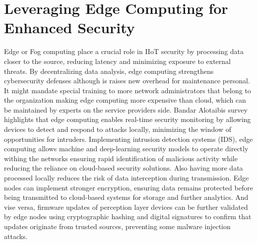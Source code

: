 \documentclass[article,a4paper]{IEEEtran}
\begin{document}
\section{Leveraging Edge Computing for Enhanced Security}
Edge or Fog computing place a crucial role in IIoT security by processing data closer to the source, reducing latency and minimizing exposure to external threats. By decentralizing data analysis, edge computing strengthens cybersecurity defenses although is raises new overhead for maintenance personal. It might mandate special training to more network administrators that belong to the organization making edge computing more expensive than cloud, which can be maintained by experts on the service providers side.
\newline 
Bandar Alotaibis survey \cite{SurveySecurity} highlights that edge computing enables real-time security monitoring by allowing devices to detect and respond to attacks locally, minimizing the window of opportunities for intruders. Implementing intrusion detection systems (IDS), edge computing allows machine and deep-learning security models to operate directly withing the networks ensuring rapid identification of malicious activity while reducing the reliance on cloud-based security solutions. 
\newline
Also having more data processed locally reduces the risk of data interception during transmission. Edge nodes can implement stronger encryption, ensuring data remains protected before being transmitted to cloud-based systems for storage and further analytics. And vise versa, firmware updates of perception layer devices can be further validated by edge nodes using cryptographic hashing and digital signatures to confirm that updates originate from trusted sources, preventing some malware injection attacks. 
\newline
\end{document}
